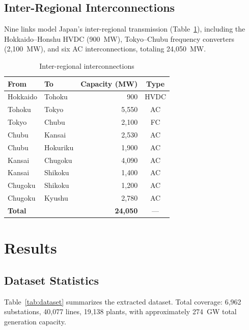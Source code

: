 \documentclass[journal]{IEEEtran}
\begin{document}
\subsection{Inter-Regional Interconnections}
Nine links model Japan's inter-regional transmission (Table~\ref{tab:ic}), including the Hokkaido--Honshu HVDC (900~MW), Tokyo--Chubu frequency converters (2,100~MW), and six AC interconnections, totaling 24,050~MW.

\begin{table}[t]
  \centering
  \caption{Inter-regional interconnections}
  \label{tab:ic}
  \begin{tabular}{llrc}
    \toprule
    From & To & Capacity (MW) & Type \\
    \midrule
    Hokkaido & Tohoku & 900 & HVDC \\
    Tohoku & Tokyo & 5,550 & AC \\
    Tokyo & Chubu & 2,100 & FC \\
    Chubu & Kansai & 2,530 & AC \\
    Chubu & Hokuriku & 1,900 & AC \\
    Kansai & Chugoku & 4,090 & AC \\
    Kansai & Shikoku & 1,400 & AC \\
    Chugoku & Shikoku & 1,200 & AC \\
    Chugoku & Kyushu & 2,780 & AC \\
    \midrule
    \multicolumn{2}{l}{\textbf{Total}} & \textbf{24,050} & --- \\
    \bottomrule
  \end{tabular}
\end{table}

\section{Results}

\subsection{Dataset Statistics}
Table~\ref{tab:dataset} summarizes the extracted dataset. Total coverage: 6,962 substations, 40,077 lines, 19,138 plants, with approximately 274~GW total generation capacity.
\end{document}
